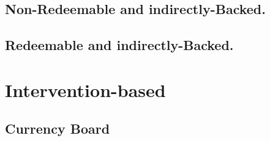 \subsection{Non-Redeemable and indirectly-Backed.}


\subsection{Redeemable and indirectly-Backed.}



\section{Intervention-based} %


\subsection{Currency Board}


